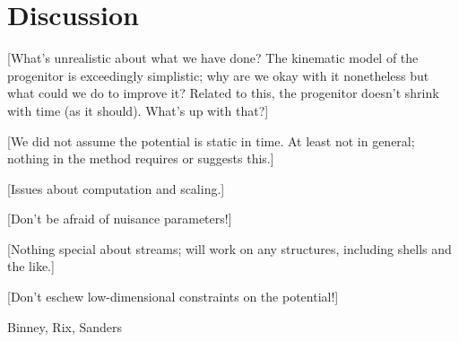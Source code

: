 \documentclass[letterpaper,12pt,preprint]{aastex}
\begin{document}
\section{Discussion}

[What's unrealistic about what we have done?  The kinematic model of
  the progenitor is exceedingly simplistic; why are we okay with it
  nonetheless but what could we do to improve it?  Related to this,
  the progenitor doesn't shrink with time (as it should).  What's up
  with that?]

[We did not assume the potential is static in time.  At least not in
  general; nothing in the method requires or suggests this.]

[Issues about computation and scaling.]

[Don't be afraid of nuisance parameters!]

[Nothing special about streams; will work on any structures, including
  shells and the like.]

[Don't eschew low-dimensional constraints on the potential!]

\acknowledgements
Binney, Rix, Sanders
\end{document}
